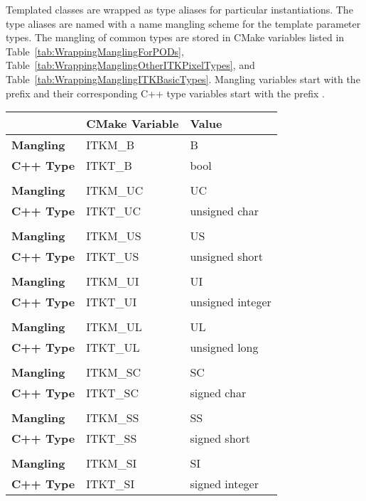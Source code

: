 Templated classes are wrapped as type aliases for particular instantiations. The
type aliases are named with a name mangling scheme for the template parameter
types. The mangling of common types are stored in CMake variables listed in
Table~\ref{tab:WrappingManglingForPODs},
Table~\ref{tab:WrappingManglingOtherITKPixelTypes}, and
Table~\ref{tab:WrappingManglingITKBasicTypes}. Mangling variables start with the prefix
 and their corresponding C++ type variables start with the
prefix .

\begin{table}
\begin{center}
\begin{tabular}{l | l | l |}
\hline
& \textbf{CMake Variable} & \textbf{Value} \\
\hline
\hline
\textbf{Mangling} & ITKM\_B & B \\ \hline
\textbf{C++ Type} & ITKT\_B & bool \\ \hline
\\ \hline
\textbf{Mangling} & ITKM\_UC & UC \\ \hline
\textbf{C++ Type} & ITKT\_UC & unsigned char \\ \hline
\\ \hline
\textbf{Mangling} & ITKM\_US & US \\ \hline
\textbf{C++ Type} & ITKT\_US & unsigned short \\ \hline
\\ \hline
\textbf{Mangling} & ITKM\_UI & UI \\ \hline
\textbf{C++ Type} & ITKT\_UI & unsigned integer \\ \hline
\\ \hline
\textbf{Mangling} & ITKM\_UL & UL \\ \hline
\textbf{C++ Type} & ITKT\_UL & unsigned long \\ \hline
\\ \hline
\textbf{Mangling} & ITKM\_SC & SC \\ \hline
\textbf{C++ Type} & ITKT\_SC & signed char \\ \hline
\\ \hline
\textbf{Mangling} & ITKM\_SS & SS \\ \hline
\textbf{C++ Type} & ITKT\_SS & signed short \\ \hline
\\ \hline
\textbf{Mangling} & ITKM\_SI & SI \\ \hline
\textbf{C++ Type} & ITKT\_SI & signed integer \\ \hline

\end{tabular}
\end{center}
\end{table}
